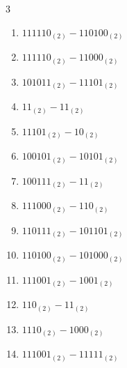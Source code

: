 \begin{multicols}{3}
\begin{enumerate}

  \item $111110_{(2)} - 110100_{(2)}$


  \item $111110_{(2)} - 11000_{(2)}$


  \item $101011_{(2)} - 11101_{(2)}$


  \item $11_{(2)} - 11_{(2)}$


\columnbreak %

  \item $11101_{(2)} - 10_{(2)}$


  \item $100101_{(2)} - 10101_{(2)}$


  \item $100111_{(2)} - 11_{(2)}$


  \item $111000_{(2)} - 110_{(2)}$


  \item $110111_{(2)} - 101101_{(2)}$


  \item $110100_{(2)} - 101000_{(2)}$


  \item $111001_{(2)} - 1001_{(2)}$


  \item $110_{(2)} - 11_{(2)}$


  \item $1110_{(2)} - 1000_{(2)}$


  \item $111001_{(2)} - 11111_{(2)}$


\end{enumerate}
\end{multicols}
